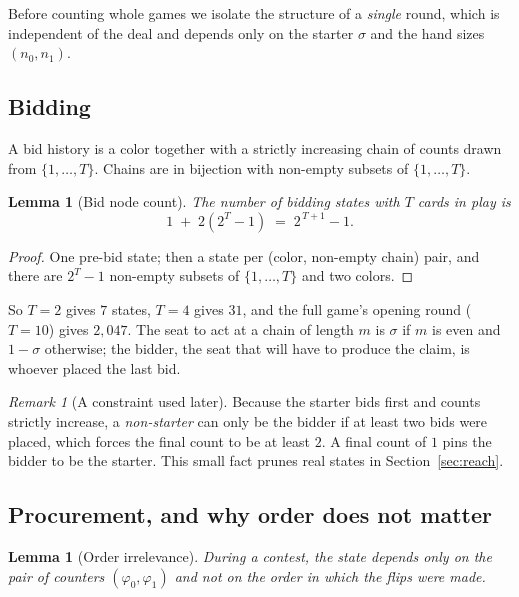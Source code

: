 \documentclass[11pt]{article}
\theoremstyle{plain}
\newtheorem{lemma}[theorem]{Lemma}
\theoremstyle{definition}
\theoremstyle{remark}
\newtheorem{remark}[theorem]{Remark}
\begin{document}
Before counting whole games we isolate the structure of a \emph{single}
round, which is independent of the deal and depends only on the starter
$\sigma$ and the hand sizes $(n_0,n_1)$.

\subsection{Bidding}

A bid history is a color together with a strictly increasing chain of
counts drawn from $\{1,\dots,T\}$. Chains are in bijection with non-empty
subsets of $\{1,\dots,T\}$.

\begin{lemma}[Bid node count]\label{lem:bidcount}
The number of bidding states with $T$ cards in play is
\[
  1 \;+\; 2\left(2^{T}-1\right) \;=\; 2^{\,T+1}-1 .
\]
\end{lemma}

\begin{proof}
One pre-bid state; then a state per (color, non-empty chain) pair, and
there are $2^T-1$ non-empty subsets of $\{1,\dots,T\}$ and two colors.
\end{proof}

So $T=2$ gives $7$ states, $T=4$ gives $31$, and the full game's opening
round ($T=10$) gives $2{,}047$. The seat to act at a chain of length $m$ is
$\sigma$ if $m$ is even and $1-\sigma$ otherwise; the bidder, the seat that
will have to produce the claim, is whoever placed the last bid.

\begin{remark}[A constraint used later]\label{rem:ladder}
Because the starter bids first and counts strictly increase, a
\emph{non-starter} can only be the bidder if at least two bids were placed,
which forces the final count to be at least $2$. A final count of $1$ pins
the bidder to be the starter. This small fact prunes real states in
Section~\ref{sec:reach}.
\end{remark}

\subsection{Procurement, and why order does not matter}

\begin{lemma}[Order irrelevance]\label{lem:order}
During a contest, the state depends only on the pair of counters
$(\varphi_0,\varphi_1)$ and not on the order in which the flips were made.
\end{lemma}
\end{document}
